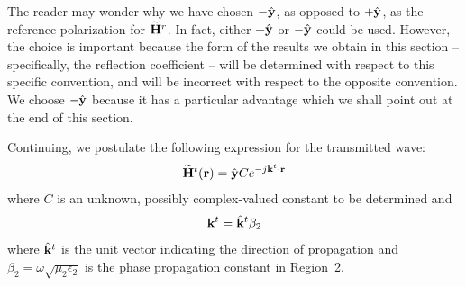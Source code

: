 The reader may wonder why we have chosen $-\hat{\bf y}$, as opposed to $+\hat{\bf y}$, as the reference polarization for $\widetilde{\bf H}^r$.
In fact, either $+\hat{\bf y}$ or $-\hat{\bf y}$ could be used.
However, the choice is important because the form of the results we obtain in this section -- specifically, the reflection coefficient -- will be determined with respect to this specific convention, and will be incorrect with respect to the opposite convention.
We choose $-\hat{\bf y}$ because it has a particular advantage which we shall point out at the end of this section.

Continuing, we postulate the following expression for the transmitted wave:
%
\begin{equation}
\widetilde{\bf H}^t({\bf r}) = \hat{\bf y} C e^{-j{\bf k}^t\cdot{\bf r}}
\label{m0164_eHt}
\end{equation}
%
where $C$ is an unknown, possibly complex-valued constant to be determined and
%
\begin{equation}
{\bf k}^t = \hat{\bf k}^t \beta_2
\end{equation}
%
where
$\hat{\bf k}^t$ is the unit vector indicating the direction of propagation and
$\beta_2=\omega\sqrt{\mu_2 \epsilon_2}$ is the phase propagation constant in Region~2.

